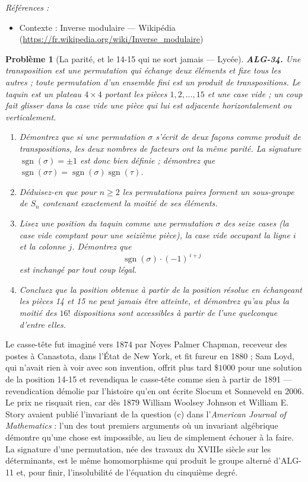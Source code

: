\documentclass[11pt]{article}
\newtheorem{problem}{Problème}
\newenvironment{refs}{\par\small\noindent\emph{Références :}\begin{itemize}\setlength\itemsep{0pt}}{\end{itemize}\normalsize}
\begin{document}
\begin{refs}
\item Contexte : Inverse modulaire --- Wikipédia (\url{https://fr.wikipedia.org/wiki/Inverse_modulaire})
\end{refs}

\bigskip

\begin{problem}[{La parité, et le 14-15 qui ne sort jamais --- Lycée}]
\textbf{ALG-34.} Une \textit{transposition} est une permutation qui échange deux éléments et fixe
tous les autres ; toute permutation d'un ensemble fini est un produit de transpositions. Le \textit{taquin}
est un plateau $4 \times 4$ portant les pièces $1, 2, \dots, 15$ et une case vide ; un coup fait glisser
dans la case vide une pièce qui lui est adjacente horizontalement ou verticalement.
\begin{enumerate}
\item[(a)] Démontrez que si une permutation $\sigma$ s'écrit de deux façons comme produit de
transpositions, les deux nombres de facteurs ont la même parité. La \textit{signature}
$\operatorname{sgn}(\sigma) = \pm 1$ est donc bien définie ; démontrez que
$\operatorname{sgn}(\sigma\tau) = \operatorname{sgn}(\sigma)\operatorname{sgn}(\tau)$.
\item[(b)] Déduisez-en que pour $n \ge 2$ les permutations paires forment un sous-groupe de $S_n$ contenant
exactement la moitié de ses éléments.
\item[(c)] Lisez une position du taquin comme une permutation $\sigma$ des seize cases (la case
vide comptant pour une seizième pièce), la case vide occupant la ligne $i$ et la colonne $j$.
Démontrez que
\[ \operatorname{sgn}(\sigma) \cdot (-1)^{\,i+j} \]
est inchangé par tout coup légal.
\item[(d)] Concluez que la position obtenue à partir de la position résolue en échangeant les pièces 14 et 15 ne
peut jamais être atteinte, et démontrez qu'au plus la moitié des $16!$ dispositions sont accessibles à
partir de l'une quelconque d'entre elles.
\end{enumerate}

\end{problem}

\noindent Le casse-tête fut imaginé vers 1874 par Noyes Palmer Chapman, receveur des postes à
Canastota, dans l'État de New York, et fit fureur en 1880 ; Sam Loyd, qui n'avait rien à voir avec son
invention, offrit plus tard $\$1000$ pour une solution de la position 14-15 et revendiqua le casse-tête
comme sien à partir de 1891 --- revendication démolie par l'histoire qu'en ont écrite Slocum et Sonneveld en
2006. Le prix ne risquait rien, car dès 1879 William Woolsey Johnson et William E. Story avaient publié
l'invariant de la question (c) dans l'\textit{American Journal of Mathematics} : l'un des tout premiers
arguments où un invariant algébrique démontre qu'une chose est impossible, au lieu de simplement échouer à
la faire. La signature d'une permutation, née des travaux du XVIIIe siècle sur les déterminants,
est le même homomorphisme qui produit le groupe alterné d'ALG-11 et, pour finir, l'insolubilité de
l'équation du cinquième degré.
\end{document}
